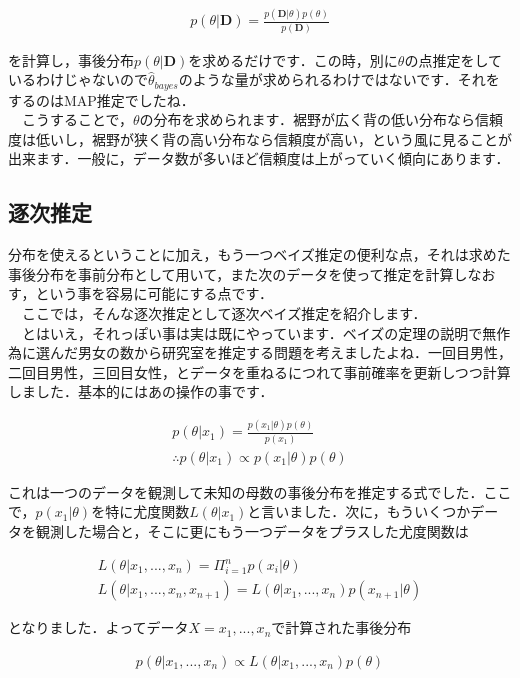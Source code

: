 \documentclass[11pt,a4paper]{jsarticle}                    %
\begin{document}
\begin{eqnarray}
p(\theta|\mathbf{D}) = \frac{p(\mathbf{D}|\theta) p(\theta)}{p(\mathbf{D})}
\end{eqnarray}

を計算し，事後分布$p(\theta|\mathbf{D})$を求めるだけです．この時，別に$\theta$の点推定をしているわけじゃないので$\hat \theta_{bayes}$のような量が求められるわけではないです．それをするのはMAP推定でしたね．\\
　こうすることで，$\theta$の分布を求められます．裾野が広く背の低い分布なら信頼度は低いし，裾野が狭く背の高い分布なら信頼度が高い，という風に見ることが出来ます．一般に，データ数が多いほど信頼度は上がっていく傾向にあります．

\subsection{逐次推定}
分布を使えるということに加え，もう一つベイズ推定の便利な点，それは求めた事後分布を事前分布として用いて，また次のデータを使って推定を計算しなおす，という事を容易に可能にする点です．\\
　ここでは，そんな逐次推定として逐次ベイズ推定を紹介します．\\
　とはいえ，それっぽい事は実は既にやっています．ベイズの定理の説明で無作為に選んだ男女の数から研究室を推定する問題を考えましたよね．一回目男性，二回目男性，三回目女性，とデータを重ねるにつれて事前確率を更新しつつ計算しました．基本的にはあの操作の事です．

\begin{eqnarray}
p(\theta|x_1) = \frac{p(x_1|\theta)p(\theta)}{p(x_1)} \nonumber \\
\therefore p(\theta|x_1) \propto p(x_1|\theta)p(\theta)
\end{eqnarray}

これは一つのデータを観測して未知の母数の事後分布を推定する式でした．ここで，$p(x_1|\theta)$を特に尤度関数$L(\theta|x_1)$と言いました．次に，もういくつかデータを観測した場合と，そこに更にもう一つデータをプラスした尤度関数は

\begin{eqnarray}
L(\theta|x_1,... ,x_n) = \Pi_{i=1}^{n} p(x_i | \theta)\\
L(\theta|x_1,... ,x_n, x_{n+1}) = L(\theta|x_1,... ,x_n) p(x_{n+1} |\theta)
\end{eqnarray}

となりました．よってデータ$X=x_1,...,x_n$で計算された事後分布


\begin{eqnarray}
p(\theta|x_1, ..., x_{n}) \propto L(\theta|x_1, ..., x_{n})p(\theta)\\
\end{eqnarray}
\end{document}
